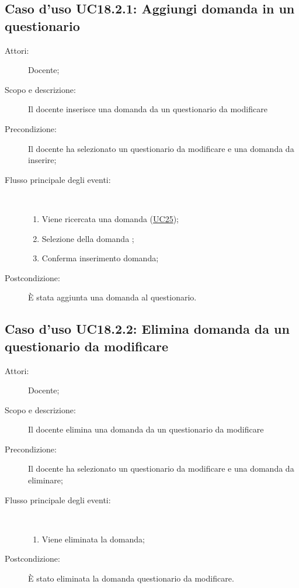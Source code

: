 \subsection{Caso d'uso UC18.2.1: Aggiungi domanda in un questionario}\begin{description}
	\item[Attori:] Docente;
	\item[Scopo e descrizione:] Il docente inserisce una domanda da un questionario da modificare
	\item[Precondizione:] Il docente ha selezionato un questionario da modificare e una domanda da inserire;
	
	\item[Flusso principale degli eventi:] \ 
	\begin{enumerate}
		\item Viene ricercata una domanda (\hyperlink{UC25}{UC25});
		\item Selezione della domanda	;
		\item Conferma inserimento domanda;
		
	\end{enumerate}
	\item[Postcondizione:] È stata aggiunta una domanda al questionario.
\end{description}
\hypertarget{UC18.2.2}{}
\subsection{Caso d'uso UC18.2.2: Elimina domanda da un questionario da  modificare}\begin{description}
	\item[Attori:] Docente;
	\item[Scopo e descrizione:] Il docente elimina una domanda da un questionario da modificare
	\item[Precondizione:] Il docente ha selezionato un questionario da modificare e una domanda da eliminare;
	
	\item[Flusso principale degli eventi:] \ 
	\begin{enumerate}
		\item Viene eliminata la domanda;
		
	\end{enumerate}
	\item[Postcondizione:] È stato eliminata la domanda questionario da modificare.
\end{description}
\hypertarget{UC18.2.3}{}
